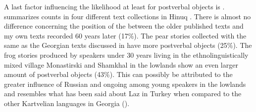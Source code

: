 \documentclass[output=paper,colorlinks,citecolor=brown,draftmode]{langscibook}
\begin{document}
A last factor influencing the likelihood at least for postverbal objects is .  summarizes counts in four different text collections in Hinuq \citep{forker_word_2016,forker_impact_2019}. There is almost no difference concerning the position of the  between the older published texts and my own texts recorded 60 years later (17\%). The pear stories collected with the same  as the Georgian texts discussed in  have more postverbal objects (25\%). The frog stories produced by speakers under 30 years living in the ethnolinguistically mixed village Monastirski and Shamkhal in the lowlands show an even larger amount of postverbal objects (43\%). This can possibly be attributed to the greater influence of Russian and ongoing  among young speakers in the lowlands and resembles what has been said about Laz in Turkey when compared to the other Kartvelian languages in Georgia ().
\end{document}
